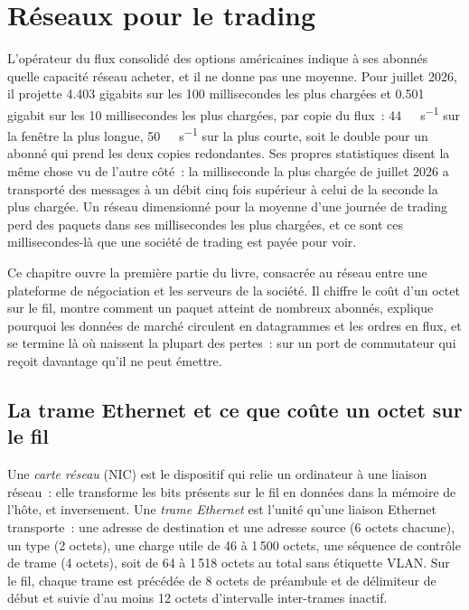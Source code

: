 \chapter{Réseaux pour le trading}\label{ch:nw:networking-for-trading}

L'opérateur du flux consolidé des options américaines indique à ses abonnés quelle capacité réseau acheter, et il ne donne pas une moyenne.
Pour juillet 2026, il projette 4.403 gigabits sur les 100 millisecondes les plus chargées et 0.501 gigabit sur les 10
millisecondes les plus chargées, par copie du flux~: \qty{44}{\giga\bit\per\second} sur la fenêtre la plus longue, \qty{50}{\giga\bit\per\second}
sur la plus courte, soit le double pour un abonné qui prend les deux copies redondantes. Ses propres statistiques disent la même chose vu de l'autre côté~: la
milliseconde la plus chargée de juillet 2026 a transporté des messages à un débit cinq fois supérieur à celui de la seconde la plus chargée. Un réseau
dimensionné pour la moyenne d'une journée de trading perd des paquets dans ses millisecondes les plus chargées, et ce sont ces millisecondes-là que
une société de trading est payée pour voir.

Ce chapitre ouvre la première partie du livre, consacrée au réseau entre une plateforme de négociation et les serveurs de la société. Il chiffre le coût d'un octet sur le fil,
montre comment un paquet atteint de nombreux abonnés, explique pourquoi les données de marché circulent en datagrammes et les ordres en flux, et se termine
là où naissent la plupart des pertes~: sur un port de commutateur qui reçoit davantage qu'il ne peut émettre.

\section{La trame Ethernet et ce que coûte un octet sur le fil}

\begin{definition}\label{def:nw:networking-for-trading:frame}
Une \emph{carte réseau} (NIC) est le dispositif qui relie un ordinateur à une liaison réseau~: 
elle transforme les bits présents sur le fil en données dans la mémoire de l'hôte, et inversement. Une \emph{trame Ethernet} est
l'unité qu'une liaison Ethernet transporte~: une adresse de destination et une adresse source (6 octets chacune), un type (2 octets), une charge utile de 46 à 1\,500
octets, une séquence de contrôle de trame (4 octets), soit de 64 à 1\,518 octets au total sans étiquette VLAN. Sur le fil, chaque trame est
précédée de 8 octets de préambule et de délimiteur de début et suivie d'au moins 12 octets d'intervalle inter-trames inactif.
\end{definition}

